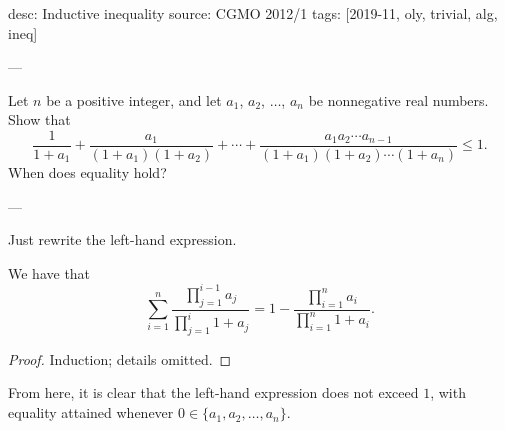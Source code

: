 desc: Inductive inequality
source: CGMO 2012/1
tags: [2019-11, oly, trivial, alg, ineq]

---

Let $n$ be a positive integer, and let $a_1$, $a_2$, $\ldots$, $a_n$ be nonnegative real numbers. Show that \[\frac1{1+a_1}+\frac{a_1}{(1+a_1)(1+a_2)}+\cdots+\frac{a_1a_2\cdots a_{n-1}}{(1+a_1)(1+a_2)\cdots(1+a_n)}\le1.\]
When does equality hold?

---

Just rewrite the left-hand expression.
\begin{claim*}
    We have that \[\sum_{i=1}^n\frac{\prod_{j=1}^{i-1}a_j}{\prod_{j=1}^i1+a_j}=1-\frac{\prod_{i=1}^na_i}{\prod_{i=1}^n1+a_i}.\]
\end{claim*}
\begin{proof}
    Induction; details omitted.
\end{proof}

From here, it is clear that the left-hand expression does not exceed $1$, with equality attained whenever $0\in\{a_1,a_2,\ldots,a_n\}$.
